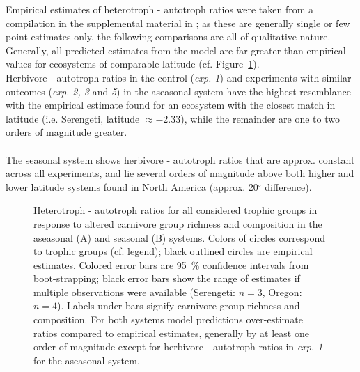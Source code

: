 Empirical estimates of heterotroph - autotroph ratios were taken from a compilation in the supplemental material in \cite{Harfoot2014}; as these are generally single or few point estimates only, the following comparisons are all of qualitative nature. Generally, all predicted estimates from the model are far greater than empirical values for ecosystems of comparable latitude (cf. Figure~\ref{fig:chap:res:dyn:ratios}). \\
Herbivore - autotroph ratios in the control (\textit{exp. 1}) and experiments with similar outcomes (\textit{exp. 2, 3} and \textit{5}) in the aseasonal system have the highest resemblance with the empirical estimate found for an ecosystem with the closest match in latitude (i.e. Serengeti, latitude $  \approx -2.33$), while the remainder are one to two orders of magnitude greater. \\\\
The seasonal system shows herbivore - autotroph ratios that are approx. constant across all experiments, and lie several orders of magnitude above both higher and lower latitude  systems found in North America (approx. 20$^\circ$ difference). \\ 
\begin{figure}[htb!]
\centering

\caption[Comparison to empirical data]{Heterotroph - autotroph ratios for all considered trophic groups in response to altered carnivore group richness and composition in the aseasonal (A) and seasonal (B) systems. Colors of circles correspond to trophic groups (cf. legend); black outlined circles are empirical estimates. Colored error bars are 95~\% confidence intervals from boot-strapping; black error bars show the range of estimates if multiple observations were available (Serengeti: $n = 3$, Oregon: $n = 4$). Labels under bars signify carnivore group richness and composition. For both systems model predictions over-estimate ratios compared to empirical estimates, generally  by at least one order of magnitude except for herbivore - autotroph ratios in \textit{exp. 1} for the aseasonal system.}
\label{fig:chap:res:dyn:ratios}
\end{figure}



%
